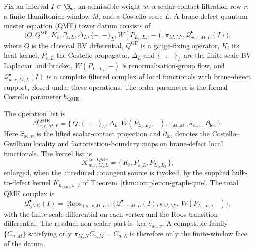\begin{defn}
\label{defn:typed-brane-defect-qme-tower}
Fix an interval \(I\subset\R_t\), an admissible weight \(w\), a
scalar-contact filtration row \(r\), a finite Hamiltonian window \(M\),
and a Costello scale \(L\).  A brane-defect quantum master equation
(QME) tower datum consists of
\[
  \bigl(
  Q,Q^{\mathrm{GF}},K_t,P_{\varepsilon,L},\Delta_L,\{-,-\}_L,
  W(P_{L_1,L_2},-),\pi_{M,M'},\mathcal Q^\bullet_{w,r,M,L}(I)
  \bigr),
\]
where \(Q\) is the classical BV differential, \(Q^{\mathrm{GF}}\) is a
gauge-fixing operator, \(K_t\) its heat kernel, \(P_{\varepsilon,L}\) the
Costello propagator, \(\Delta_L\) and \(\{-,-\}_L\) are the finite-scale
BV Laplacian and bracket, \(W(P_{L_1,L_2},-)\) is
renormalisation-group flow, and \(\mathcal Q^\bullet_{w,r,M,L}(I)\) is a
complete filtered complex of local functionals with brane-defect support,
closed under these operations.  The order parameter is the formal
Costello parameter \(\hbar_{\mathrm{QME}}\).

The operation list is
\[
  \mathcal O^{\mathrm{QME}}_{w,r,M,L}
  =
  \{\,Q,\{-,-\}_L,\Delta_L,W(P_{L_1,L_2},-),\pi_{M,M'},
      \widehat\sigma_{\mathrm{sc},w},\partial_{\mathrm{loc}}\,\}.
\]
Here \(\widehat\sigma_{\mathrm{sc},w}\) is the lifted scalar-contact
projection and \(\partial_{\mathrm{loc}}\) denotes the Costello--Gwilliam
locality and factorisation-boundary maps on brane-defect local
functionals.  The kernel list is
\[
  \mathcal K^{\mathrm{ker,QME}}_{w,r,M,L}
  =
  \{\,K_t,P_{\varepsilon,L},P_{L_1,L_2}\,\},
\]
enlarged, when the unreduced cotangent source is invoked, by the supplied
bulk-to-defect kernel \(K_{\hbar_{\mathrm{QME}},w,I}\) of
Theorem~\ref{thm:completion-graph-qme}.  The total QME complex is
\[
  \mathcal Q^\bullet_{\mathrm{QME}}(I)
  =
  \operatorname{Roos}_{(w,r,M,L)}
  \bigl\{\mathcal Q^\bullet_{w,r,M,L}(I),
  \pi_{M,M'},\,W(P_{L_1,L_2},-)\bigr\},
\]
with the finite-scale differential on each vertex and the Roos transition
differential.  The residual non-scalar part is
\(\ker\widehat\sigma_{\mathrm{sc},w}\).  A compatible family
\(\{C_{n,M}\}\) satisfying only \(\pi_{M,N}C_{n,M}=C_{n,N}\) is therefore
only the finite-window face of the datum.


\end{defn}
